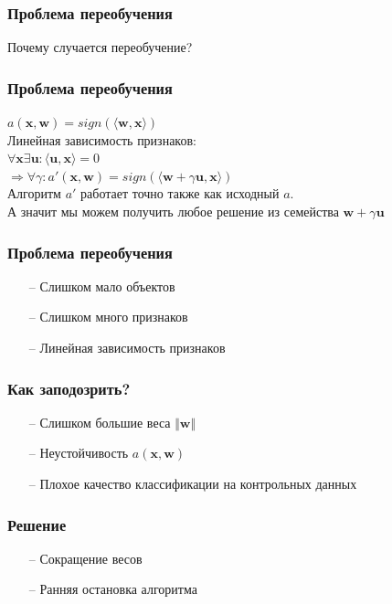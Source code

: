 \documentclass[12pt]{beamer}
\begin{document}
\begin{frame}\frametitle{Проблема переобучения}
Почему случается переобучение?
\end{frame}

\begin{frame}\frametitle{Проблема переобучения}
$a(\mathbf{x}, \mathbf{w}) = sign(\langle \mathbf{w}, \mathbf{x}\rangle)$\\
Линейная зависимость признаков:\\
$\forall \mathbf{x} \exists \mathbf{u}: \langle \mathbf{u}, \mathbf{x}\rangle = 0$\\
$\Rightarrow \forall \gamma: a'(\mathbf{x}, \mathbf{w}) = sign(\langle \mathbf{w} + \gamma \mathbf{u}, \mathbf{x}\rangle)$\\
\vspace{5mm}
Алгоритм $a'$ работает точно также как исходный $a$.\\
А значит мы можем получить любое решение из семейства $\mathbf{w} + \gamma \mathbf{u}$
\end{frame}

\begin{frame}\frametitle{Проблема переобучения}
\begin{itemize}
\item[--] Слишком мало объектов
\item[--] Слишком много признаков
\item[--] Линейная зависимость признаков
\end{itemize}
\end{frame}

\begin{frame}\frametitle{Как заподозрить?}
\begin{itemize}
\item[--] Слишком большие веса $\Vert \mathbf{w} \Vert$
\item[--] Неустойчивость $a(\mathbf{x},\mathbf{w})$
\item[--] Плохое качество классификации на контрольных данных
\end{itemize}
\end{frame}

\begin{frame}\frametitle{Решение}
\begin{itemize}
\item[--] Сокращение весов
\item[--] Ранняя остановка алгоритма
\end{itemize}
\end{frame}
\end{document}
